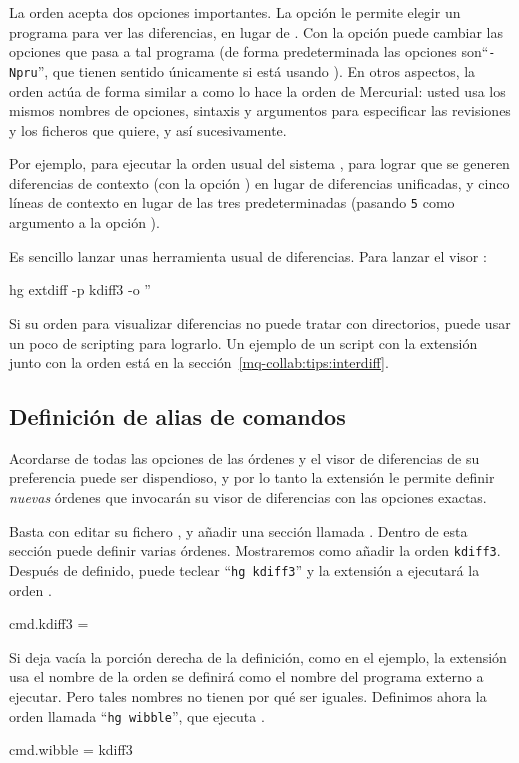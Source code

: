 La orden  acepta dos opciones importantes.
La opción  le permite elegir un programa
para ver las diferencias, en lugar de .  Con la opción
 puede cambiar las opciones que
 pasa a tal programa (de forma predeterminada
las opciones son``\texttt{-Npru}'', que tienen sentido únicamente si
está usando ).  En otros aspectos, la orden
 actúa de forma similar a como lo hace la
orden  de Mercurial: usted usa los mismos nombres de
opciones, sintaxis y argumentos para especificar las revisiones y los
ficheros que quiere, y así sucesivamente.

Por ejemplo, para ejecutar la orden usual del sistema ,
para lograr que se generen diferencias de contexto (con la opción
) en lugar de diferencias unificadas, y cinco líneas
de contexto en lugar de las tres predeterminadas (pasando \texttt{5}
como argumento a la opción ).

Es sencillo lanzar unas herramienta usual de diferencias.  Para lanzar
el visor :
\begin{codesample2}
  hg extdiff -p kdiff3 -o ''
\end{codesample2}

Si su orden para visualizar diferencias no puede tratar con
directorios, puede usar un poco de scripting para lograrlo.  Un
ejemplo de un script con la extensión  junto con la orden
 está en la sección~\ref{mq-collab:tips:interdiff}.

\subsection{Definición de alias de comandos}

Acordarse de todas las opciones de las órdenes
 y el visor de diferencias de su preferencia
puede ser dispendioso, y por lo tanto la extensión  le
permite definir \emph{nuevas} órdenes que invocarán su visor de
diferencias con las opciones exactas.

Basta con editar su fichero \hgrc, y añadir una sección llamada
.  Dentro de esta sección puede definir varias
órdenes. Mostraremos como añadir la orden \texttt{kdiff3}.  Después de
definido, puede teclear ``\texttt{hg kdiff3}'' y la extensión a
 ejecutará la orden .
\begin{codesample2}
  [extdiff]
  cmd.kdiff3 =
\end{codesample2}
Si deja vacía la porción derecha de la definición, como en el ejemplo,
la extensión  usa el nombre de la orden se definirá
como el nombre del programa externo a ejecutar.  Pero tales nombres no
tienen por qué ser iguales.  Definimos ahora la orden llamada
 ``\texttt{hg wibble}'', que ejecuta .
\begin{codesample2}
  [extdiff]
  cmd.wibble = kdiff3
\end{codesample2}

